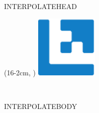 \documentclass[10pt, a4paper, parskip=half,
               enlargefirstpage, pagenumber=no]{scrlttr2}
\begin{document}
INTERPOLATEHEAD

\begin{textblock*}{3cm}(16\TPHorizModule-3cm-2cm, )
\noindent \includegraphics[width=3cm,height=3cm]{lshift-logo-blue-rgb}
\end{textblock*}





\begin{letter}{%
\tystrrecipient \\
\tystrrecipientaddress
}
\opening{\tystropening}
INTERPOLATEBODY
\closing{\tystrclosing}
\end{letter}
\end{document}
